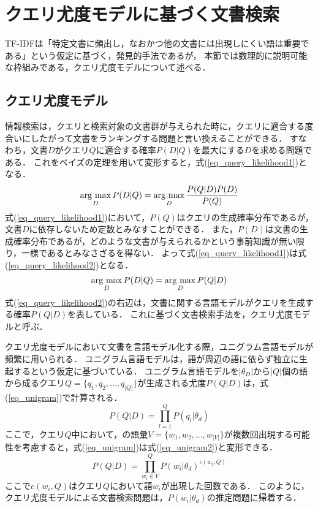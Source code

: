\section{クエリ尤度モデルに基づく文書検索}
TF-IDFは「特定文書に頻出し，なおかつ他の文書には出現しにくい語は重要である」という仮定に基づく，発見的手法であるが，
本節では数理的に説明可能な枠組みである，クエリ尤度モデル\cite{query_likelihood}について述べる．

\subsection{クエリ尤度モデル}
情報検索は，クエリと検索対象の文書群が与えられた時に，クエリに適合する度合いにしたがって文書をランキングする問題と言い換えることができる．
すなわち，文書$D$がクエリ$Q$に適合する確率$P(D|Q)$を最大にする$D$を求める問題である．
これをベイズの定理を用いて変形すると，式(\ref{eq_query_likelihood1})となる．
\begin{equation}
    \mathop{\rm arg~max}\limits_{D} P(D|Q) = \mathop{\rm arg~max}\limits_{D} \frac{P(Q|D)P(D)}{P(Q)}    \label{eq_query_likelihood1}
\end{equation}
式(\ref{eq_query_likelihood1})において，$P(Q)$はクエリの生成確率分布であるが，文書$D$に依存しないため定数とみなすことができる．
また，$P(D)$は文書の生成確率分布であるが，どのような文書が与えられるかという事前知識が無い限り，一様であるとみなさざるを得ない．
よって式(\ref{eq_query_likelihood1})は式(\ref{eq_query_likelihood2})となる．
\begin{equation}
    \mathop{\rm arg~max}\limits_{D} P(D|Q) = \mathop{\rm arg~max}\limits_{D} P(Q|D) \label{eq_query_likelihood2}
\end{equation}
式(\ref{eq_query_likelihood2})の右辺は，文書に関する言語モデルがクエリを生成する確率$P(Q|D)$を表している．
これに基づく文書検索手法を，クエリ尤度モデルと呼ぶ．

クエリ尤度モデルにおいて文書を言語モデル化する際，ユニグラム言語モデルが頻繁に用いられる．
ユニグラム言語モデルは，語が周辺の語に依らず独立に生起するという仮定に基づいている．
ユニグラム言語モデルを$|\theta_D|$から$|Q|$個の語から成るクエリ$Q = \{q_1, q_2, ..., q_|Q|\}$が生成される尤度$P(Q|D)$は，式(\ref{eq_unigram})で計算される．
\begin{equation}
    P(Q|D) = \prod^{Q}_{l=1}P(q_l|\theta_d) \label{eq_unigram}
\end{equation}
ここで，クエリ$Q$中において，の語彙$V = \{w_1, w_2, ..., w_|V|\}$が複数回出現する可能性を考慮すると，式(\ref{eq_unigram})は式(\ref{eq_unigram2})と変形できる．
\begin{equation}
    P(Q|D) = \prod^{Q}_{w_i \in V}P(w_i|\theta_d)^{c(w_i, Q)} \label{eq_unigram2}
\end{equation}
ここで$c(w_i, Q)$はクエリ$Q$において語$w_i$が出現した回数である．
このように，クエリ尤度モデルによる文書検索問題は，$P(w_i|\theta_d)$の推定問題に帰着する．

